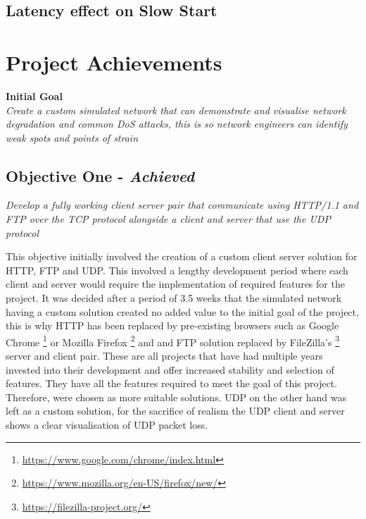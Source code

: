 \subsection{Latency effect on Slow Start}


\clearpage
\section{Project Achievements}

{\bf Initial Goal}\\
{\it Create a custom simulated network that can demonstrate and visualise network degradation and common DoS attacks, this is so network engineers can identify weak spots and points of strain}

\newcommand{\chromeUrl}{\url{https://www.google.com/chrome/index.html}}
\newcommand{\firefoxUrl}{\url{https://www.mozilla.org/en-US/firefox/new/}}
\newcommand{\fileZillaUrl}{\url{https://filezilla-project.org/}}

\subsection{Objective One - {\it Achieved}}
{\it Develop a fully working client server pair that communicate using HTTP/1.1 and FTP over the TCP protocol alongside a client and server that use the UDP protocol}

This objective initially involved the creation of a custom client server solution for HTTP, FTP and UDP. This involved a lengthy development period where each client and server would require the implementation of required features for the project. It was decided after a period of 3.5 weeks that the simulated network having a custom solution created no added value to the initial goal of the project, this is why HTTP has been replaced by pre-existing browsers such as Google Chrome \footnote{\chromeUrl} or Mozilla Firefox \footnote{\firefoxUrl} and and FTP solution replaced by FileZilla's \footnote{\fileZillaUrl} server and client pair. These are all projects that have had multiple years invested into their development and offer increased stability and selection of features. They have all the features required to meet the goal of this project. Therefore, were chosen as more suitable solutions. UDP on the other hand was left as a custom solution, for the sacrifice of realism the UDP client and server shows a clear visualisation of UDP packet loss.

